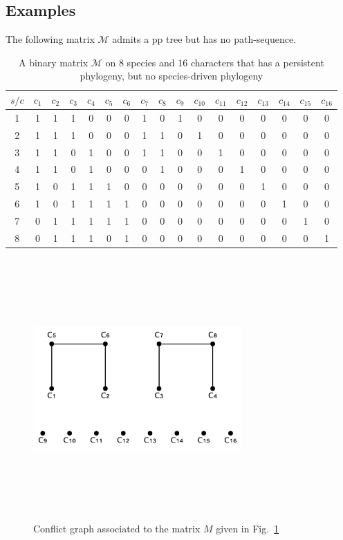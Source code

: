 \subsection*{Examples}

The following matrix $\mathcal M$ admits a pp tree but has no path-sequence.

\begin{table}
\centering
\begin{tabular}{c|cccccccccccccccc}
    $s/c$ & $c_1$ & $c_2$ & $c_3$ & $c_4$ & $c_5$ & $c_6$ & $c_7$ & $c_8$ & $c_9$ & $c_{10}$ &
$c_{11}$ & $c_{12}$ & $c_{13}$ & $c_{14}$ & $c_{15}$ & $c_{16}$\\\hline
1 & 1 & 1 & 1 & 0 & 0 & 0 & 1 & 0 & 1 & 0 & 0 & 0 & 0 & 0 & 0 & 0 \\
2 & 1 & 1 & 1 & 0 & 0 & 0 & 1 & 1 & 0 & 1 & 0 & 0 & 0 & 0 & 0 & 0 \\
3 & 1 & 1 & 0 & 1 & 0 & 0 & 1 & 1 & 0 & 0 & 1 & 0 & 0 & 0 & 0 & 0 \\
4 & 1 & 1 & 0 & 1 & 0 & 0 & 0 & 1 & 0 & 0 & 0 & 1 & 0 & 0 & 0 & 0 \\
5 & 1 & 0 & 1 & 1 & 1 & 0 & 0 & 0 & 0 & 0 & 0 & 0 & 1 & 0 & 0 & 0 \\
6 & 1 & 0 & 1 & 1 & 1 & 1 & 0 & 0 & 0 & 0 & 0 & 0 & 0 & 1 & 0 & 0 \\
7 & 0 & 1 & 1 & 1 & 1 & 1 & 0 & 0 & 0 & 0 & 0 & 0 & 0 & 0 & 1 & 0 \\
8 & 0 & 1 & 1 & 1 & 0 & 1 & 0 & 0 & 0 & 0 & 0 & 0 & 0 & 0 & 0 & 1 \\
\end{tabular}
\caption{A binary matrix  $\mathcal M$ on $8$ species and $16$
  characters that has a persistent phylogeny, but no species-driven phylogeny}
\label{table:matAmmetteP-pp}
\end{table}


\begin{figure}[htbp]
\centering
\includegraphics[height=10cm, width=8cm,keepaspectratio]{GrafoConflitti1}
\caption{Conflict graph associated to the matrix  $M$ given in Fig.~\ref{table:matAmmetteP-pp} }
\label{fig:GcM}
\end{figure}


